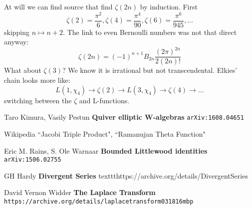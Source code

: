 \documentclass[12pt]{article}
\begin{document}
\noindent At will we can find source that find $\zeta(2n)$ by induction.  First $$\zeta(2) = \frac{\pi^2}{6}, \zeta(4)= \frac{\pi^4}{90}, \zeta(6)=\frac{\pi^6}{945}, \dots $$
skipping $n \mapsto n+2$. The link to even Bernoulli numbers was not that direct anyway:
$$\zeta(2n) = (-1)^{n+1} B_{2n} \frac{(2\pi)^{2n}}{2(2n)!} $$
What about $\zeta(3)$?  We know it is irrational but not transcendental.  Elkies' chain looks more like:
$$ L(1, \chi_4) \to \zeta(2) \to L(3, \chi_4) \to \zeta(4) \to \dots $$
switching between the $\zeta$ and L-functions.  

\selectfont \fontsize{12}{10}\selectfont

\begin{thebibliography}{}

\item Taro Kimura, Vasily Pestun \textbf{Quiver elliptic W-algebras} \texttt{arXiv:1608.04651}
\item Wikipedia ``Jacobi Triple Product", ``Ramanujan Theta Function"
\item Eric M. Rains, S. Ole Warnaar \textbf{Bounded Littlewood identities} \texttt{arXiv:1506.02755}
\item GH Hardy \textbf{Divergent Series} texttt{https://archive.org/details/DivergentSeries}
\item David Vernon Widder \textbf{The Laplace Transform} \texttt{https://archive.org/details/laplacetransform031816mbp}

\end{thebibliography}
\end{document}
